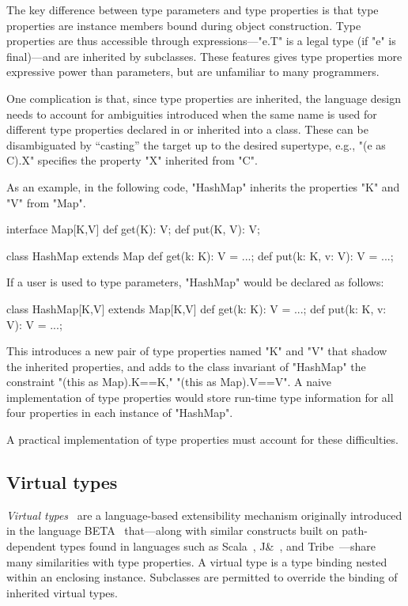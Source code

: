The key difference between type parameters and type properties
is that type properties are
instance members bound during object construction.  Type
properties are thus accessible through expressions---\xcd"e.T" is
a legal type (if \xcd"e" is final)---and are inherited by subclasses.
These features gives type properties more expressive power than
parameters, but are unfamiliar to many programmers.

One complication is that,
since type properties are inherited, the language design needs
to account for ambiguities introduced when the same name is
used for different type properties declared in or inherited into a class.
These can be disambiguated
by ``casting'' the target up to the desired supertype,
e.g., \xcd"(e as C).X" specifies
the property \xcd"X" inherited from \xcd"C".

As an example, in the following \Xten code, \xcd"HashMap" 
inherits the properties \xcd"K" and \xcd"V" from \xcd"Map".
\begin{xten}
interface Map[K,V] {
  def get(K): V;
  def put(K, V): V;
}

class HashMap extends Map {
  def get(k: K): V = ...;
  def put(k: K, v: V): V = ...;
}
\end{xten}
If a user is used to type parameters, \xcd"HashMap" would be
declared as follows:
\begin{xten}
class HashMap[K,V] extends Map[K,V] {
  def get(k: K): V = ...;
  def put(k: K, v: V): V = ...;
}
\end{xten}
This introduces a new pair of type properties named \xcd"K" and
\xcd"V" that shadow the inherited properties,
and adds to the class invariant of \xcd"HashMap" the constraint
\xcd"{(this as Map).K==K," \xcd"(this as Map).V==V}".
A naive implementation of type properties would store run-time
type information for all four properties in each instance
of \xcd"HashMap".

A practical implementation of type properties must account for
these difficulties.

\subsection{Virtual types}

\emph{Virtual types}~\cite{beta,mp89-virtual-classes,ernst06-virtual}
are a language-based extensibility
mechanism 
originally introduced in the language
BETA~\cite{beta} that---along with
similar constructs built on path-dependent types found in
languages such as Scala~\cite{scala}, J\&~\cite{nqm06},
and Tribe~\cite{cdnw07-tribe}---share many similarities with type properties.
A virtual type is a type binding nested within an enclosing instance.
Subclasses are permitted to override the binding of inherited virtual types. 


